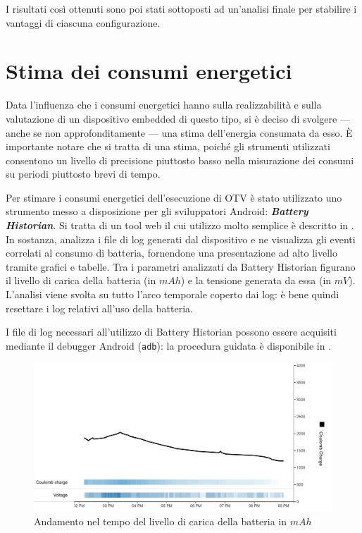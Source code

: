 \vspace{1em}

I risultati così ottenuti sono poi stati sottoposti ad un'analisi finale per stabilire i vantaggi di ciascuna configurazione. 

\section{Stima dei consumi energetici}
\label{sec:stimaconsumi}

Data l'influenza che i consumi energetici hanno sulla realizzabilità e sulla valutazione di un dispositivo embedded di questo
tipo, si è deciso di svolgere --- anche se non approfonditamente --- una stima dell'energia consumata da esso.
È importante notare che si tratta di una stima, poiché gli strumenti utilizzati consentono un livello di precisione piuttosto
basso nella misurazione dei consumi su periodi piuttosto brevi di tempo.

Per stimare i consumi energetici dell'esecuzione di OTV è stato utilizzato uno strumento messo a disposizione per gli 
sviluppatori Android: \textit{\textbf{Battery Historian}}. Si tratta di un tool web il cui utilizzo molto semplice è 
descritto in \cite{adev_battery}. In sostanza, analizza i file di log generati dal dispositivo e ne visualizza gli eventi
correlati al consumo di batteria, fornendone una presentazione ad alto livello tramite grafici e tabelle.
Tra i parametri analizzati da Battery Historian figurano il livello di carica della batteria (in $mAh$) e la tensione generata
da essa (in $mV$). L'analisi viene svolta su tutto l'arco temporale coperto dai log: è bene quindi resettare i log relativi
all'uso della batteria.

I file di log necessari all'utilizzo di Battery Historian possono essere acquisiti mediante il debugger Android (\texttt{adb}): 
la procedura guidata è disponibile in \cite{adev_batlog}.

\begin{figure}[h!]
    \begin{center}
        \includegraphics[scale=0.28]{img/battery_historian_coulomb.jpg}
        \caption{Andamento nel tempo del livello di carica della batteria in $mAh$}
    \end{center}
\end{figure}

